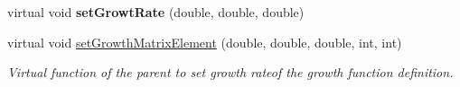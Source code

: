 \begin{DoxyCompactItemize}
\item 
\hypertarget{classGrowthFunctionBase_ac9995b11d7a4823d2d2c45a603b51916}{}virtual void {\bfseries set\+Growt\+Rate} (double, double, double)\label{classGrowthFunctionBase_ac9995b11d7a4823d2d2c45a603b51916}

\item 
\hypertarget{classGrowthFunctionBase_a8cf8a1604ced5f314707fd137e9a8d3e}{}virtual void \hyperlink{classGrowthFunctionBase_a8cf8a1604ced5f314707fd137e9a8d3e}{set\+Growth\+Matrix\+Element} (double, double, double, int, int)\label{classGrowthFunctionBase_a8cf8a1604ced5f314707fd137e9a8d3e}

\begin{DoxyCompactList}\small\item\em Virtual function of the parent to set growth rateof the growth function definition. \end{DoxyCompactList}\end{DoxyCompactItemize}
